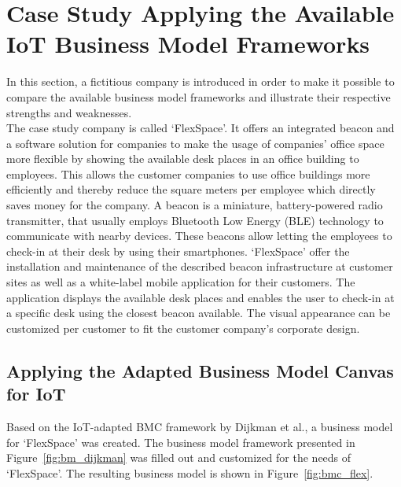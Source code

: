 \section{Case Study Applying the Available IoT Business Model Frameworks}
\label{sec:bmf_comparison}
\vspace{-1em}
	In this section, a fictitious company is introduced in order to make it possible to compare the available business model frameworks and illustrate their respective strengths and weaknesses.\\
	The case study company is called `FlexSpace'. It offers an integrated beacon and a software solution for companies to make the usage of companies' office space more flexible by showing the available desk places in an office building to employees. This allows the customer companies to use office buildings more efficiently and thereby reduce the square meters per employee which directly saves money for the company. A beacon is a miniature, battery-powered radio transmitter, that usually employs  Bluetooth Low Energy (BLE) technology to communicate with nearby devices. These beacons allow letting the employees to check-in at their desk by using their smartphones. `FlexSpace' offer the installation and maintenance of the described beacon infrastructure at customer sites as well as a white-label mobile application for their customers. The application displays the available desk places and enables the user to check-in at a specific desk using the closest beacon available. The visual appearance can be customized per customer to fit the customer company's corporate design.
	\vspace{-1em}
	\subsection{Applying the Adapted Business Model Canvas for IoT}
	\vspace{-1em}
		Based on the IoT-adapted BMC framework by Dijkman et al., a business model for `FlexSpace' was created. The business model framework presented in Figure~\ref{fig:bm_dijkman} was filled out and customized for the needs of `FlexSpace'. The resulting business model is shown in Figure~\ref{fig:bmc_flex}.


